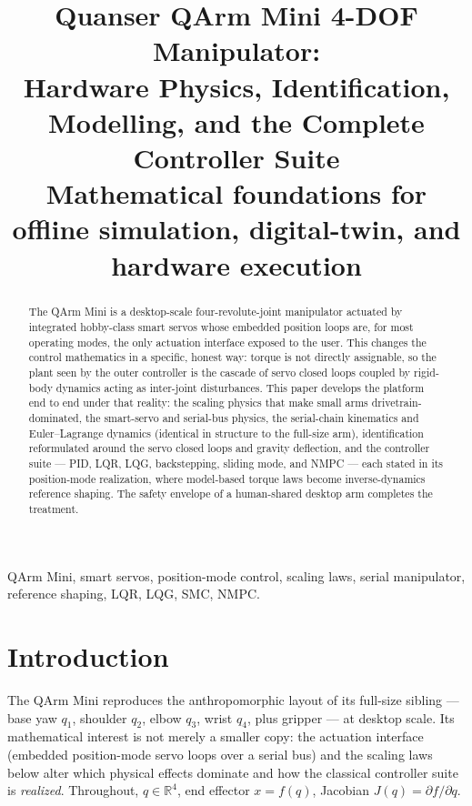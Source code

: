 \documentclass[conference]{IEEEtran}
\begin{document}
\title{Quanser QArm Mini 4-DOF Manipulator:\\ Hardware Physics, Identification, Modelling, and the Complete Controller Suite\\
{\footnotesize Mathematical foundations for offline simulation, digital-twin, and hardware execution}}

\author{
}

\maketitle

\begin{abstract}
The QArm Mini is a desktop-scale four-revolute-joint manipulator actuated by integrated hobby-class smart servos whose embedded position loops are, for most operating modes, the only actuation interface exposed to the user. This changes the control mathematics in a specific, honest way: torque is not directly assignable, so the plant seen by the outer controller is the cascade of servo closed loops coupled by rigid-body dynamics acting as inter-joint disturbances. This paper develops the platform end to end under that reality: the scaling physics that make small arms drivetrain-dominated, the smart-servo and serial-bus physics, the serial-chain kinematics and Euler--Lagrange dynamics (identical in structure to the full-size arm), identification reformulated around the servo closed loops and gravity deflection, and the controller suite --- PID, LQR, LQG, backstepping, sliding mode, and NMPC --- each stated in its position-mode realization, where model-based torque laws become inverse-dynamics reference shaping. The safety envelope of a human-shared desktop arm completes the treatment.
\end{abstract}

\begin{IEEEkeywords}
QArm Mini, smart servos, position-mode control, scaling laws, serial manipulator, reference shaping, LQR, LQG, SMC, NMPC.
\end{IEEEkeywords}

\section{Introduction}
The QArm Mini reproduces the anthropomorphic layout of its full-size sibling --- base yaw $q_1$, shoulder $q_2$, elbow $q_3$, wrist $q_4$, plus gripper --- at desktop scale. Its mathematical interest is not merely a smaller copy: the actuation interface (embedded position-mode servo loops over a serial bus) and the scaling laws below alter which physical effects dominate and how the classical controller suite is \emph{realized}. Throughout, $q\in\mathbb R^4$, end effector $x = f(q)$, Jacobian $J(q) = \partial f/\partial q$.
\end{document}
